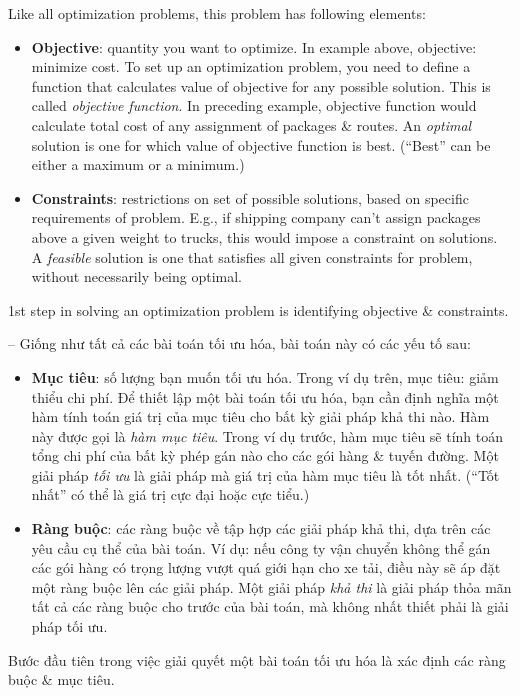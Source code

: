 \documentclass{article}
\begin{document}
Like all optimization problems, this problem has following elements:
\begin{itemize}
    \item {\bf Objective}: quantity you want to optimize. In example above, objective: minimize cost. To set up an optimization problem, you need to define a function that calculates value of objective for any possible solution. This is called {\it objective function}. In preceding example, objective function would calculate total cost of any assignment of packages \& routes. An {\it optimal} solution is one for which value of objective function is best. (``Best'' can be either a maximum or a minimum.)
    \item {\bf Constraints}: restrictions on set of possible solutions, based on specific requirements of problem. E.g., if shipping company can't assign packages above a given weight to trucks, this would impose a constraint on solutions. A {\it feasible} solution is one that satisfies all given constraints for problem, without necessarily being optimal.
\end{itemize}
1st step in solving an optimization problem is identifying objective \& constraints.

-- Giống như tất cả các bài toán tối ưu hóa, bài toán này có các yếu tố sau:
\begin{itemize}
    \item {\bf Mục tiêu}: số lượng bạn muốn tối ưu hóa. Trong ví dụ trên, mục tiêu: giảm thiểu chi phí. Để thiết lập một bài toán tối ưu hóa, bạn cần định nghĩa một hàm tính toán giá trị của mục tiêu cho bất kỳ giải pháp khả thi nào. Hàm này được gọi là {\it hàm mục tiêu}. Trong ví dụ trước, hàm mục tiêu sẽ tính toán tổng chi phí của bất kỳ phép gán nào cho các gói hàng \& tuyến đường. Một giải pháp {\it tối ưu} là giải pháp mà giá trị của hàm mục tiêu là tốt nhất. (``Tốt nhất'' có thể là giá trị cực đại hoặc cực tiểu.)
    \item {\bf Ràng buộc}: các ràng buộc về tập hợp các giải pháp khả thi, dựa trên các yêu cầu cụ thể của bài toán. Ví dụ: nếu công ty vận chuyển không thể gán các gói hàng có trọng lượng vượt quá giới hạn cho xe tải, điều này sẽ áp đặt một ràng buộc lên các giải pháp. Một giải pháp {\it khả thi} là giải pháp thỏa mãn tất cả các ràng buộc cho trước của bài toán, mà không nhất thiết phải là giải pháp tối ưu.
\end{itemize}
Bước đầu tiên trong việc giải quyết một bài toán tối ưu hóa là xác định các ràng buộc \& mục tiêu.
\end{document}
